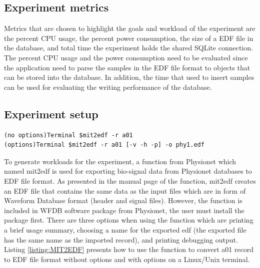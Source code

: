 \subsection{Experiment metrics}
Metrics that are chosen to highlight the goals and workload of the experiment are the percent CPU usage, the percent power consumption, the size of a EDF file in the database, and total time the experiment holds the shared SQLite connection. The percent CPU usage and the power consumption need to be evaluated since the application need to parse the samples in the EDF file format to objects that can be stored into the database. In addition, the time that used to insert samples can be used for evaluating the writing performance of the database.
\subsection{Experiment setup}
\begin{lstlisting}[caption={Convert mit2edf by using terminal}, label = {listing:MIT2EDF}, captionpos=b]
(no options)Terminal $mit2edf -r a01 
(options)Terminal $mit2edf -r a01 [-v -h -p] -o phy1.edf
\end{lstlisting}
To generate workloads for the experiment, a function from Physionet which named mit2edf is used for exporting bio-signal data from Physionet databases to EDF file format. As presented in the manual page of the function, mit2edf creates an EDF file that contains the same data as the input files which are in form of Waveform Database format (header and signal files). However, the function is included in WFDB software package from Physionet, the user must install the package first. There are three options when using the function which are printing a brief usage summary, choosing a name for the exported edf (the exported file has the same name as the imported record), and printing debugging output. Listing \ref{listing:MIT2EDF} presents how to use the function to convert a01 record to EDF file format without options and with options on a Linux/Unix terminal.
